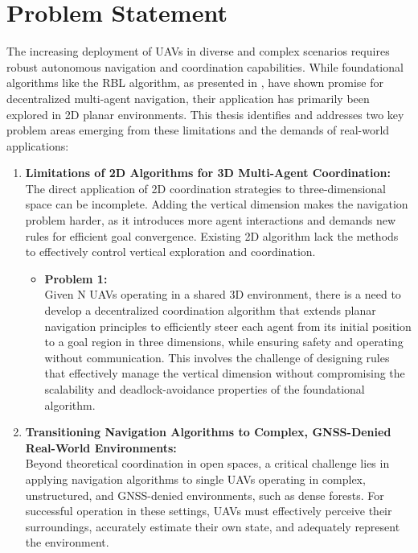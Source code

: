 \section{Problem Statement}
  The increasing deployment of \ac{UAV}s in diverse and complex scenarios requires robust autonomous navigation and coordination capabilities. 
  While foundational algorithms like the \ac{RBL} algorithm, as presented in \cite{rbl_paper}, have shown promise for decentralized multi-agent navigation, their application has primarily been explored in \ac{2D} planar environments. 
  This thesis identifies and addresses two key problem areas emerging from these limitations and the demands of real-world applications:
  \begin{enumerate}
    \item \textbf{Limitations of 2D Algorithms for 3D Multi-Agent Coordination: } \\
      The direct application of 2D coordination strategies to three-dimensional space can be incomplete. 
      Adding the vertical dimension makes the navigation problem harder, as it introduces more agent interactions and demands new rules for efficient goal convergence.
      Existing 2D algorithm lack the methods to effectively control vertical exploration and coordination.
      \begin{itemize}
        \item \textbf{Problem 1: } \\
        Given N \ac{UAV}s operating in a shared 3D environment, there is a need to develop a decentralized coordination algorithm that extends planar navigation principles to efficiently steer each agent from its initial position to a goal region in three dimensions, while ensuring safety and operating without communication. 
        This involves the challenge of designing rules that effectively manage the vertical dimension without compromising the scalability and deadlock-avoidance properties of the foundational algorithm.
      \end{itemize}
    \item \textbf{Transitioning Navigation Algorithms to Complex, GNSS-Denied Real-World Environments: } \\
      Beyond theoretical coordination in open spaces, a critical challenge lies in applying navigation algorithms to single \ac{UAV}s operating in complex, unstructured, and GNSS-denied environments, such as dense forests. 
      For successful operation in these settings, \ac{UAV}s must effectively perceive their surroundings, accurately estimate their own state, and adequately represent the environment.

\end{enumerate}
